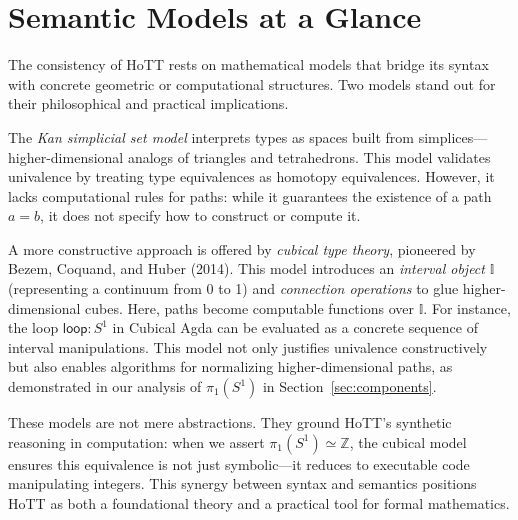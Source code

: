\section{Semantic Models at a Glance}\label{sec:models}

The consistency of HoTT rests on mathematical models that bridge its syntax with concrete geometric or computational structures. Two models stand out for their philosophical and practical implications.  

The \emph{Kan simplicial set model} interprets types as spaces built from simplices—higher-dimensional analogs of triangles and tetrahedrons. This model validates univalence by treating type equivalences as homotopy equivalences. However, it lacks computational rules for paths: while it guarantees the existence of a path \(a = b\), it does not specify how to construct or compute it.  

A more constructive approach is offered by \emph{cubical type theory}, pioneered by Bezem, Coquand, and Huber (2014). This model introduces an \emph{interval object} \(\mathbb{I}\) (representing a continuum from 0 to 1) and \emph{connection operations} to glue higher-dimensional cubes. Here, paths become computable functions over \(\mathbb{I}\). For instance, the loop \(\textsf{loop} : S^1\) in Cubical Agda can be evaluated as a concrete sequence of interval manipulations. This model not only justifies univalence constructively but also enables algorithms for normalizing higher-dimensional paths, as demonstrated in our analysis of \(\pi_1(S^1)\) in Section~\ref{sec:components}.  

These models are not mere abstractions. They ground HoTT's synthetic reasoning in computation: when we assert \(\pi_1(S^1) \simeq \mathbb{Z}\), the cubical model ensures this equivalence is not just symbolic—it reduces to executable code manipulating integers. This synergy between syntax and semantics positions HoTT as both a foundational theory and a practical tool for formal mathematics.  
